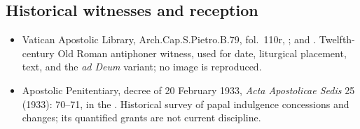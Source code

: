 \subsection{Historical witnesses and reception}

\begin{itemize}
  \item Vatican Apostolic Library, Arch.Cap.S.Pietro.B.79, fol.~110r, ;  and . Twelfth-century Old Roman antiphoner witness, used for date, liturgical placement, text, and the \textit{ad Deum} variant; no image is reproduced.
  \item Apostolic Penitentiary, decree of 20 February 1933, \textit{Acta Apostolicae Sedis} 25 (1933): 70--71, in the . Historical survey of papal indulgence concessions and changes; its quantified grants are not current discipline.
\end{itemize}
